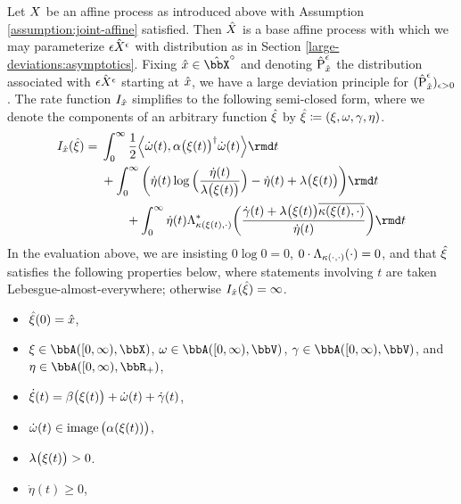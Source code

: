 \begin{theorem}
  \label{theorem:ldp-closed-form}
  Let $X$ be an affine process as introduced above with Assumption \ref{assumption:joint-affine} satisfied.
  Then $\hat{X}$ is a base affine process with which we may parameterize $\hat{\epsilon X^\epsilon}$ with distribution as in Section \ref{large-deviations:asymptotics}.
  Fixing $\hat\stateVar \in \hat\stateSpace^\circ$ and denoting $\hat{{\operatorname{P}}}^\epsilon_{\hat{x}}$ the distribution associated with $\hat{\epsilon X^\epsilon}$ starting at $\hat{x}$, we have a large deviation principle for $(\hat{{\operatorname{P}}}^\epsilon_{\hat{x}})_{\epsilon>0}$.
  The rate function $I_{\hat{x}}$ simplifies to the following semi-closed form, where we denote the components of an arbitrary function $\hat{\xi}$ by $\hat{\xi} \coloneqq (\xi, \omega, \gamma, \eta)$.
  \begin{equation*}
    \rf_{\hat\stateVar}(\hat\pathVar) = 
    \begin{aligned}[t]
      &\int_0^\infty \frac12 \Bprj{\dot\omega(t)}{\affDiff\big(\pathVar(t)\big)^\dagger \dot\omega(t)} \rmd t \\
      &+ \int_0^\infty \bigg( \dot\eta(t)\log\Big(\frac{\dot\eta(t)}{\affInt\big(\pathVar(t)\big)} \Big) - \dot\eta(t) + \affInt\big(\pathVar(t)\big) \bigg) \rmd t  \\
      &\qquad+ \int_0^\infty \dot\eta(t) \ode_{\affDist(\pathVar(t),\cdot)}^*\bigg( \frac{\dot\gamma(t) + \affInt\big(\pathVar(t)\big)\overline{\affDist(\pathVar(t), \cdot)}}{\dot\eta(t)} \bigg) \rmd t
    \end{aligned}
  \end{equation*}
  In the evaluation above, we are insisting $0\log 0 = 0$, $0 \cdot \Lambda_{\kappa(\cdot,\cdot)}(\cdot) = 0$, and that $\hat{\xi}$ satisfies the following properties below, where statements involving $t$ are taken Lebesgue-almost-everywhere; otherwise $I_{\hat{x}}(\hat{\xi}) = \infty$.
  \begin{itemize}
    \item
      $\hat{\xi}(0) = \hat{x}$,
    \item
      $\pathVar \in \acpathSpace{[0,\infty)}{\stateSpace}$, $\omega \in \acpathSpace{[0,\infty)}{\vecSpace}$, $\gamma \in \acpathSpace{[0,\infty)}{\vecSpace}$, and $\eta \in \acpathSpace{[0,\infty)}{\bbR_+}$,
    \item
      $\dot{\xi}(t) = \beta\big(\xi(t)\big) + \dot\omega(t) + \dot\gamma(t)$,
    \item
      $\dot\omega(t) \in \operatorname{image}\big(\alpha(\xi(t))\big)$,
    \item
      $\lambda\big(\xi(t)\big) > 0$.
    \item
      $\dot\eta(t) \geq 0$,
  \end{itemize}
\end{theorem}
